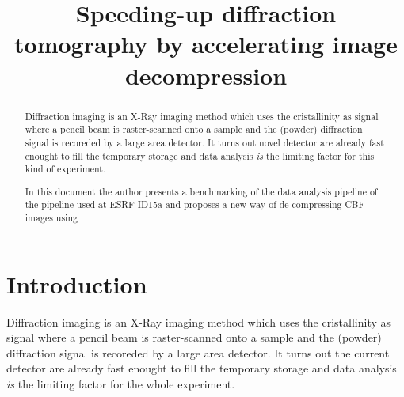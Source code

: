 \documentclass[preprint, pdf]{iucr}              %
\begin{document}

\title{Speeding-up diffraction tomography by accelerating image decompression}

 





\maketitle                        %

\begin{synopsis}
\end{synopsis}

\begin{abstract}

Diffraction imaging is an X-Ray imaging method which uses the cristallinity
as signal where a pencil beam is raster-scanned onto a sample and the
(powder) diffraction signal is recoreded by a large area detector.
It turns out novel detector are already
fast enought to fill the temporary storage and data analysis \emph{is} the
limiting factor for this kind of experiment. 

In this document the author presents a benchmarking of the data analysis
pipeline of the pipeline used at ESRF ID15a and proposes a new way of
de-compressing CBF images using 

\end{abstract}


\section{Introduction}

Diffraction imaging is an X-Ray imaging method which uses the cristallinity
as signal where a pencil beam is raster-scanned onto a sample and the
(powder) diffraction signal is recoreded by a large area detector.
It turns out the current detector are already
fast enought to fill the temporary storage and data analysis \emph{is} the
limiting factor for the whole experiment. 
\end{document}
